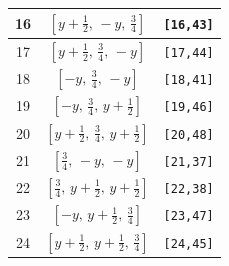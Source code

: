 \documentclass[fleqn,8pt]{jsarticle}
\begin{document}
\begin{longtable}{ccc}
16 & $\left[ y + \frac{1}{2},\, - y,\, \frac{3}{4} \right]$ & {\tt [16,43]} \\ \hline
17 & $\left[ y + \frac{1}{2},\, \frac{3}{4},\, - y \right]$ & {\tt [17,44]} \\ \hline
18 & $\left[ - y,\, \frac{3}{4},\, - y \right]$ & {\tt [18,41]} \\ \hline
19 & $\left[ - y,\, \frac{3}{4},\, y + \frac{1}{2} \right]$ & {\tt [19,46]} \\ \hline
20 & $\left[ y + \frac{1}{2},\, \frac{3}{4},\, y + \frac{1}{2} \right]$ & {\tt [20,48]} \\ \hline
21 & $\left[ \frac{3}{4},\, - y,\, - y \right]$ & {\tt [21,37]} \\ \hline
22 & $\left[ \frac{3}{4},\, y + \frac{1}{2},\, y + \frac{1}{2} \right]$ & {\tt [22,38]} \\ \hline
23 & $\left[ - y,\, y + \frac{1}{2},\, \frac{3}{4} \right]$ & {\tt [23,47]} \\ \hline
24 & $\left[ y + \frac{1}{2},\, y + \frac{1}{2},\, \frac{3}{4} \right]$ & {\tt [24,45]} \\
\end{longtable}
\renewcommand{\arraystretch}{1.2}
\end{document}
